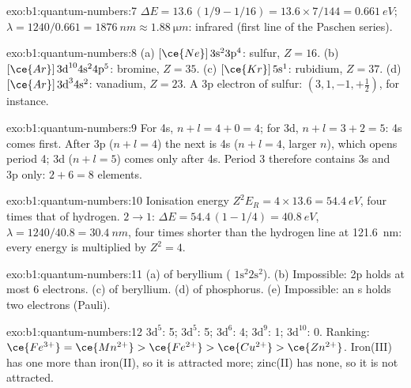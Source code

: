 \begin{solution}{exo:b1:quantum-numbers:7}
$\Delta E = 13.6\,(1/9 - 1/16) = 13.6 \times 7/144 = \qty{0.661}{eV}$;
$\lambda = 1240/0.661 = \qty{1876}{nm} \approx \qty{1.88}{\micro m}$:
infrared (first line of the Paschen series).
\end{solution}

\begin{solution}{exo:b1:quantum-numbers:8}
(a) $[\ce{Ne}]\,3\text{s}^2 3\text{p}^4$: sulfur, $Z = 16$.
(b) $[\ce{Ar}]\,3\text{d}^{10} 4\text{s}^2 4\text{p}^5$: bromine, $Z = 35$.
(c) $[\ce{Kr}]\,5\text{s}^1$: rubidium, $Z = 37$.
(d) $[\ce{Ar}]\,3\text{d}^3 4\text{s}^2$: vanadium, $Z = 23$.
A 3p electron of sulfur: $(3, 1, -1, +\tfrac12)$, for instance.
\end{solution}

\begin{solution}{exo:b1:quantum-numbers:9}
For 4s, $n + l = 4 + 0 = 4$; for 3d, $n + l = 3 + 2 = 5$: 4s comes
first. After 3p ($n + l = 4$) the next  is 4s ($n + l = 4$, larger
$n$), which opens period 4; 3d ($n + l = 5$) comes only after 4s.
Period 3 therefore contains 3s and 3p only: $2 + 6 = 8$ elements.
\end{solution}

\begin{solution}{exo:b1:quantum-numbers:10}
Ionisation energy $Z^2E_R = 4 \times 13.6 = \qty{54.4}{eV}$, four times
that of hydrogen. $2 \to 1$: $\Delta E = 54.4\,(1 - 1/4) = \qty{40.8}{eV}$,
$\lambda = 1240/40.8 = \qty{30.4}{nm}$, four times shorter than the
hydrogen line at \qty{121.6}{nm}: every energy is multiplied by $Z^2 = 4$.
\end{solution}

\begin{solution}{exo:b1:quantum-numbers:11}
(a)  of beryllium ( $1\text{s}^2 2\text{s}^2$).
(b) Impossible: 2p holds at most 6 electrons. (c)  of
beryllium. (d)  of phosphorus. (e) Impossible: an s 
holds two electrons (Pauli).
\end{solution}

\begin{solution}{exo:b1:quantum-numbers:12}
 $3\text{d}^5$: 5;  $3\text{d}^5$: 5; 
$3\text{d}^6$: 4;  $3\text{d}^9$: 1; 
$3\text{d}^{10}$: 0. Ranking: $\ce{Fe^{3+}} = \ce{Mn^{2+}} > \ce{Fe^{2+}}
> \ce{Cu^{2+}} > \ce{Zn^{2+}}$. Iron(III) has one more 
than iron(II), so it is attracted more; zinc(II) has none, so it is not
attracted.
\end{solution}

